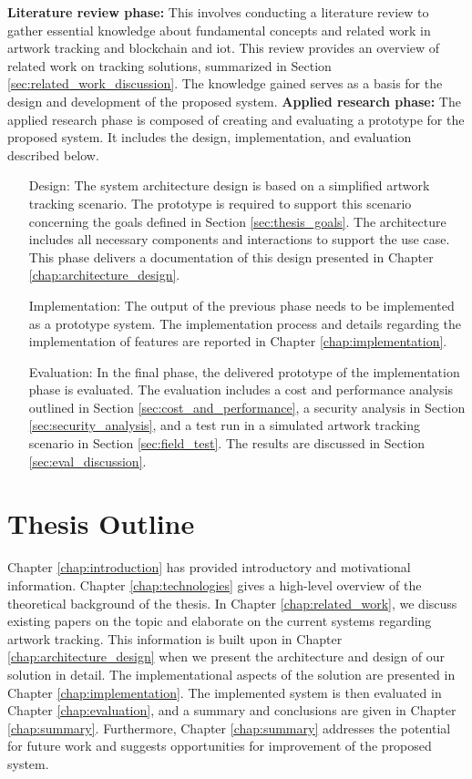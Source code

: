 \textbf{Literature review phase:} This involves conducting a literature review to gather essential knowledge about fundamental concepts and related work in artwork tracking and blockchain and \gls{iot}. This review provides an overview of related work on tracking solutions, summarized in Section \ref{sec:related_work_discussion}. The knowledge gained serves as a basis for the design and development of the proposed system.
\clearpage
\textbf{Applied research phase:} The applied research phase is composed of creating and evaluating a prototype for the proposed system. It includes the design, implementation, and evaluation described below.

\begin{itemize}[font=\itshape, align=left, itemindent=0.5cm]
    \item[Design:] The system architecture design is based on a simplified artwork tracking scenario. The prototype is required to support this scenario concerning the goals defined in Section \ref{sec:thesis_goals}. The architecture includes all necessary components and interactions to support the use case. This phase delivers a documentation of this design presented in Chapter \ref{chap:architecture_design}.
    \item[Implementation:] The output of the previous phase needs to be implemented as a prototype system. The implementation process and details regarding the implementation of features are reported in Chapter \ref{chap:implementation}. 
    \item[Evaluation:] In the final phase, the delivered prototype of the implementation phase is evaluated. The evaluation includes a cost and performance analysis outlined in Section \ref{sec:cost_and_performance}, a security analysis in Section \ref{sec:security_analysis}, and a test run in a simulated artwork tracking scenario in Section \ref{sec:field_test}. The results are discussed in Section \ref{sec:eval_discussion}.
\end{itemize}


\section{Thesis Outline}
Chapter \ref{chap:introduction} has provided introductory and motivational information. Chapter \ref{chap:technologies} gives a high-level overview of the theoretical background of the thesis. In Chapter \ref{chap:related_work}, we discuss existing papers on the topic and elaborate on the current systems regarding artwork tracking. This information is built upon in Chapter \ref{chap:architecture_design} when we present the architecture and design of our solution in detail. The implementational aspects of the solution are presented in Chapter \ref{chap:implementation}. The implemented system is then evaluated in Chapter \ref{chap:evaluation}, and a summary and conclusions are given in Chapter \ref{chap:summary}. Furthermore, Chapter \ref{chap:summary} addresses the potential for future work and suggests opportunities for improvement of the proposed system.
